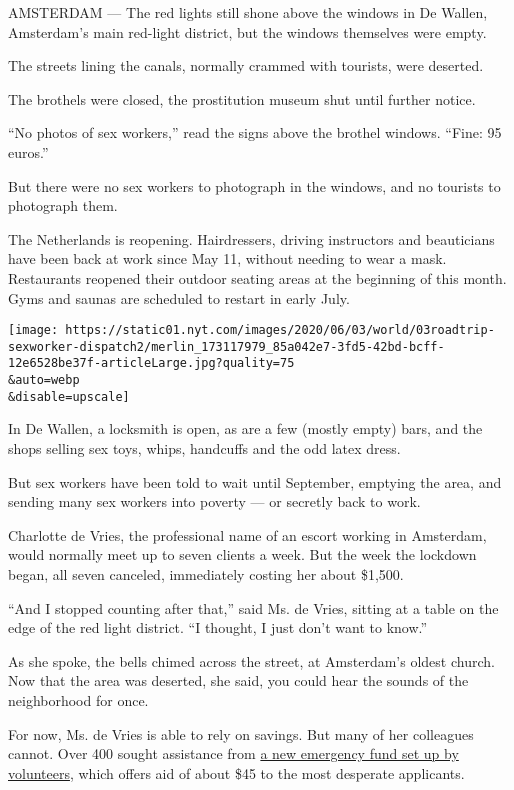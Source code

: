 AMSTERDAM --- The red lights still shone above the windows in De Wallen,
Amsterdam's main red-light district, but the windows themselves were
empty.

The streets lining the canals, normally crammed with tourists, were
deserted.

The brothels were closed, the prostitution museum shut until further
notice.

``No photos of sex workers,'' read the signs above the brothel windows.
``Fine: 95 euros.''

But there were no sex workers to photograph in the windows, and no
tourists to photograph them.

The Netherlands is reopening. Hairdressers, driving instructors and
beauticians have been back at work since May 11, without needing to wear
a mask. Restaurants reopened their outdoor seating areas at the
beginning of this month. Gyms and saunas are scheduled to restart in
early July.

\texttt{[image: https://static01.nyt.com/images/2020/06/03/world/03roadtrip-sexworker-dispatch2/merlin\_173117979\_85a042e7-3fd5-42bd-bcff-12e6528be37f-articleLarge.jpg?quality=75\\\&auto=webp\\\&disable=upscale]}

In De Wallen, a locksmith is open, as are a few (mostly empty) bars, and
the shops selling sex toys, whips, handcuffs and the odd latex dress.

But sex workers have been told to wait until September, emptying the
area, and sending many sex workers into poverty --- or secretly back to
work.

Charlotte de Vries, the professional name of an escort working in
Amsterdam, would normally meet up to seven clients a week. But the week
the lockdown began, all seven canceled, immediately costing her about
\$1,500.

``And I stopped counting after that,'' said Ms. de Vries, sitting at a
table on the edge of the red light district. ``I thought, I just don't
want to know.''

As she spoke, the bells chimed across the street, at Amsterdam's oldest
church. Now that the area was deserted, she said, you could hear the
sounds of the neighborhood for once.

For now, Ms. de Vries is able to rely on savings. But many of her
colleagues cannot. Over 400 sought assistance from
\href{https://www.dutchemergencyfund.nl/}{a new emergency fund set up by
volunteers}, which offers aid of about \$45 to the most desperate
applicants.

